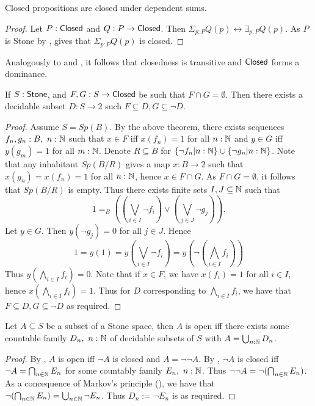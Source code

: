 \begin{corollary}\label{ClosedDependentSums}
  Closed propositions are closed under dependent sums. 
\end{corollary}
\begin{proof}
  Let $P:\mathsf{Closed}$ and $Q:P \to \mathsf{Closed}$. 
  Then $\Sigma_{p:P} Q(p) \leftrightarrow \exists_{p:P} Q(p)$.
  As $P$ is Stone by , 
   gives that $\Sigma_{p:P} Q(p)$ is closed. 
\end{proof}
\begin{remark}
  Analogously to  and , it follows that 
  closedness is transitive and $\mathsf{Closed}$ forms a dominance. 
\end{remark}


\begin{lemma}\label{StoneSeperated}
  If $S:\mathsf{Stone} $, and $F,G:S \to \mathsf{Closed}$ be such that $F\cap G = \emptyset$. 
  Then there exists a decidable subset $D:S \to 2$ such $F\subseteq D, G \subseteq \neg D$. 
\end{lemma}
\begin{proof}
  Assume $S = Sp(B)$. 
  By the above theorem, there exists sequences $f_n,g_n:B,~n:\mathbb{N}$ such that 
  $x\in F$ iff $x(f_n) = 1$ for all $n:\mathbb{N}$ and 
  $y\in G$ iff $y(g_m) = 1$ for all $m:\mathbb{N}$. 
%
  Denote $R\subseteq B$ for $\{\neg f_n|n:\mathbb{N}\} \cup\{\neg g_n|n:\mathbb{N}\}$. 
  Note that any inhabitant $Sp(B/R)$ gives a map $x:B\to 2$ such that
  $x(g_n)= x(f_n) = 1$ for all $n:\mathbb{N}$, hence $x\in F \cap G$. 
  As $F\cap G = \emptyset $, it follows that $Sp(B/R)$ is empty.
%
  Thus there exists finite sets $I,J\subseteq \mathbb{N} $ such that 
  $$1 =_B ((\bigvee_{i\in I} \neg f_i) \vee (\bigvee_{j\in J} \neg g_j)).$$
%
  Let $y\in G$. Then $y(\neg g_j) = 0$ for all $j \in J$. 
  Hence 
  $$
  1 = y(1) 
  = 
  y(\bigvee_{i\in I} \neg f_i) = y (\neg (\bigwedge_{i\in I} f_i))
  $$
  Thus $y(\bigwedge_{i\in I} f_i) = 0$. 
  Note that if $x\in F$, we have $x(f_i) = 1$ for all $i\in I$, hence 
  $x(\bigwedge_{i\in I} f_i) = 1$. 
  Thus for $D$ corresponding to $\bigwedge_{i\in I} f_i$, we have that 
  $F\subseteq D, G\subseteq \neg D$ as required. 
\end{proof} 
\begin{corollary}\label{StoneOpenSubsets}
  Let $A\subseteq S$ be a subset of a Stone space, then 
  $A$ is open iff there exists some countable family $D_n,~n:\mathbb{N}$ of decidable subsets of $S$ with 
  $A = \bigcup_{n:\mathbb{N}} D_n$. 
\end{corollary}
\begin{proof}
  By , $A$ is open iff $\neg A$ is closed and $A = \neg \neg A$. 
  By , $\neg A$ is closed iff 
  $\neg A = \bigcap_{n\in \mathbb{N}} E_n$ for some countably family $E_n,~n:\mathbb{N}$. 
  Thus $\neg \neg A = \neg (\bigcap_{n\in \mathbb{N}} E_n)$. 
  As a concequence of Markov's principle (), we have that 
  $\neg (\bigcap_{n\in \mathbb{N}} E_n)= \bigcup_{n\in \mathbb{N}} \neg E_n$. 
  Thus $D_n := \neg E_n$ is as required. 
\end{proof}
